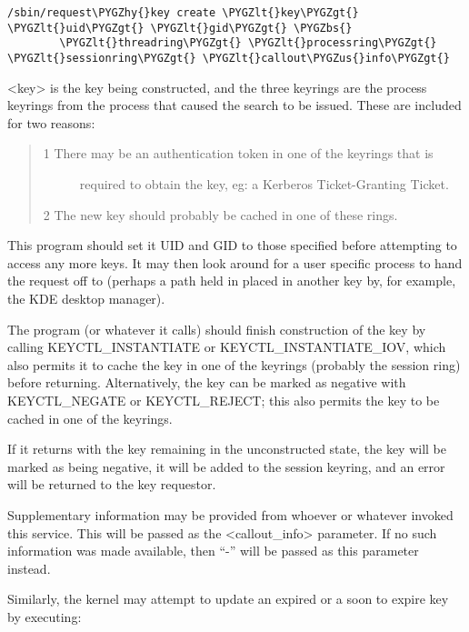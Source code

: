 \documentclass[a4paper,8pt,english]{sphinxmanual}
\def\PYGZbs{\char`\\}
\def\PYGZus{\char`\_}
\def\PYGZlt{\char`\<}
\def\PYGZgt{\char`\>}
\def\PYGZhy{\char`\-}
\begin{document}
\begin{Verbatim}[commandchars=\\\{\}]
/sbin/request\PYGZhy{}key create \PYGZlt{}key\PYGZgt{} \PYGZlt{}uid\PYGZgt{} \PYGZlt{}gid\PYGZgt{} \PYGZbs{}
        \PYGZlt{}threadring\PYGZgt{} \PYGZlt{}processring\PYGZgt{} \PYGZlt{}sessionring\PYGZgt{} \PYGZlt{}callout\PYGZus{}info\PYGZgt{}
\end{Verbatim}

\textless{}key\textgreater{} is the key being constructed, and the three keyrings are the process
keyrings from the process that caused the search to be issued. These are
included for two reasons:
\begin{quote}
\begin{description}
\item[{1  There may be an authentication token in one of the keyrings that is}] \leavevmode
required to obtain the key, eg: a Kerberos Ticket-Granting Ticket.

\end{description}

2  The new key should probably be cached in one of these rings.
\end{quote}

This program should set it UID and GID to those specified before attempting to
access any more keys. It may then look around for a user specific process to
hand the request off to (perhaps a path held in placed in another key by, for
example, the KDE desktop manager).

The program (or whatever it calls) should finish construction of the key by
calling KEYCTL\_INSTANTIATE or KEYCTL\_INSTANTIATE\_IOV, which also permits it to
cache the key in one of the keyrings (probably the session ring) before
returning.  Alternatively, the key can be marked as negative with KEYCTL\_NEGATE
or KEYCTL\_REJECT; this also permits the key to be cached in one of the
keyrings.

If it returns with the key remaining in the unconstructed state, the key will
be marked as being negative, it will be added to the session keyring, and an
error will be returned to the key requestor.

Supplementary information may be provided from whoever or whatever invoked this
service. This will be passed as the \textless{}callout\_info\textgreater{} parameter. If no such
information was made available, then ``-'' will be passed as this parameter
instead.

Similarly, the kernel may attempt to update an expired or a soon to expire key
by executing:
\end{document}
